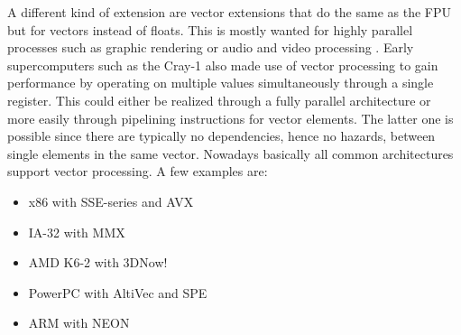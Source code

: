 A different kind of extension are vector extensions that do the same as the FPU but for vectors instead of floats.
This is mostly wanted for highly parallel processes such as graphic rendering or audio and video processing .
Early supercomputers such as the Cray-1  also made use of vector processing to gain performance by operating on multiple values  simultaneously through a single register.
This could either be realized through a fully parallel architecture or more easily through pipelining instructions for vector elements.
The latter one is possible since there are typically no dependencies, hence no hazards, between single elements in the same vector.
Nowadays basically all common architectures support vector processing.
A few examples are:

\noindent\begin{minipage}[t]{\textwidth}
    \vspace{1em}
    \begin{minipage}[t]{0.4\textwidth}
\begin{itemize}
    \item x86 with SSE-series and AVX
    \item IA-32 with MMX
    \item AMD K6-2 with 3DNow!
\end{itemize}
\end{minipage}
\begin{minipage}[t]{0.6\textwidth}
\begin{itemize}
    \item PowerPC with AltiVec and SPE
    \item ARM with NEON
\end{itemize}
\end{minipage}
    \vspace{1em}
\end{minipage}

